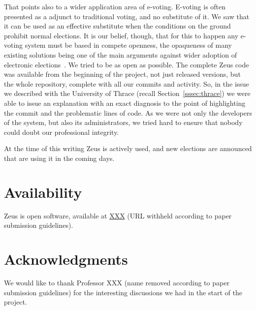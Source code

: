 \documentclass[letterpaper,10pt]{article}
\begin{document}
That points also to a wider application area of e-voting. E-voting is
often presented as a adjunct to traditional voting, and no substitute
of it. We saw that it can be used as an effective substitute when the
conditions on the ground prohibit normal elections. It is our belief,
though, that for this to happen any e-voting system must be based in
compete openness, the opaqueness of many existing solutions being one
of the main arguments against wider adoption of electronic
elections~\cite{simons:2012,jones:2012}. We tried to be as open as
possible. The complete Zeus code was available from the beginning of
the project, not just released versions, but the whole repository,
complete with all our commits and activity. So, in the issue we
described with the University of Thrace (recall
Section~\ref{sssec:thrace}) we were able to issue an explanation with
an exact diagnosis to the point of highlighting the commit and the
problematic lines of code. As we were not only the developers of the
system, but also its administrators, we tried hard to ensure that
nobody could doubt our professional integrity.

At the time of this writing Zeus is actively used, and new elections
are announced that are using it in the coming days.

\section{Availability}

Zeus is open software, available at \url{XXX} (URL withheld according
to paper submission guidelines).

\section{Acknowledgments}

We would like to thank Professor XXX (name removed according to paper
submission guidelines) for the interesting discussions we had in the
start of the project.

{\footnotesize


}
\end{document}
